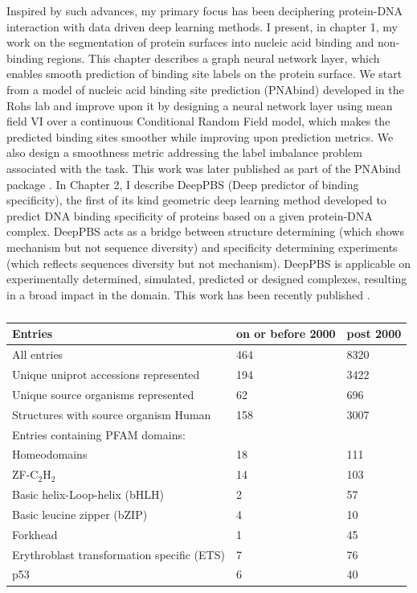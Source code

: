Inspired by such advances, my primary focus has been deciphering protein-DNA interaction with data driven deep learning methods. I present, in chapter 1,
my work on the segmentation of protein surfaces into nucleic acid binding and non-binding regions. This chapter describes a graph neural network layer, which enables smooth prediction of binding site labels on the protein surface. We start from a model of nucleic acid binding site prediction (PNAbind) developed in the Rohs lab and improve upon it by designing a neural network layer using mean field VI over a continuous Conditional Random Field model, which makes the predicted binding sites smoother while improving upon prediction metrics. We also design a smoothness metric addressing the label imbalance problem associated with the task. This work was later published as part of the PNAbind package \citep{Sagendorf2024}.
In Chapter 2, I describe DeepPBS (Deep predictor of binding specificity), the first of its kind geometric deep learning method developed to predict DNA binding specificity of proteins based on a given protein-DNA complex. DeepPBS acts as a bridge between structure determining (which shows mechanism but not sequence diversity) and specificity determining experiments (which reflects sequences diversity but not mechanism). DeepPBS is applicable on experimentally determined, simulated, predicted or designed complexes, resulting in a broad impact in the domain. This work has been recently published \citep{Mitra2024}.

\begin{table}[]
\centering
\begin{tabular}{|l|l|l|}
\hline
Entries & on or before 2000 & post 2000 \\
\hline
All entries & 464 & 8320  \\
Unique uniprot accessions represented & 194 & 3422  \\
Unique source organisms represented & 62 & 696 \\
Structures with source organism Human & 158 & 3007  \\
\hline
Entries containing PFAM domains: &  &  \\
\hline
Homeodomains & 18 & 111  \\
ZF-C$_2$H$_2$ & 14 & 103  \\
Basic helix-Loop-helix (bHLH) & 2 & 57  \\
Basic leucine zipper (bZIP) & 4 & 10   \\
Forkhead & 1 & 45   \\
Erythroblast transformation specific (ETS) & 7 & 76   \\
p53 & 6 & 40  \\
\hline
\end{tabular}
\caption[Quanitification of growth of protein-DNA structures on the PDB (based on pre-2000 and post-2000 release dates).]{}
\label{table:intro}
\end{table}

